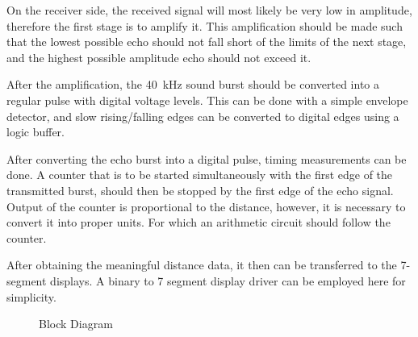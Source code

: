 \documentclass[12pt, a4paper]{article}
\begin{document}
        \bigskip
        On the receiver side, the received signal will most likely be very low in amplitude, therefore the first stage is to amplify it. This amplification should be made such that the lowest possible echo should not fall short of the limits of the next stage, and the highest possible amplitude echo should not exceed it.
        
        \bigskip
        After the amplification, the \SI{40}{\kilo\hertz} sound burst should be converted into a regular pulse with digital voltage levels. This can be done with a simple envelope detector, and slow rising/falling edges can be converted to digital edges using a logic buffer. 

        \bigskip
        After converting the echo burst into a digital pulse, timing measurements can be done. A counter that is to be started simultaneously with the first edge of the transmitted burst, should then be stopped by the first edge of the echo signal. Output of the counter is proportional to the distance, however, it is necessary to convert it into proper units. For which an arithmetic circuit should follow the counter.

        \bigskip
        After obtaining the meaningful distance data, it then can be transferred to the 7-segment displays. A binary to 7 segment display driver can be employed here for simplicity.

        \pagebreak
        \begin{landscape}\centering
            \vspace*{1.8cm}
            \begin{figure}[H]\centering
                \caption{Block Diagram}
            \end{figure}
        \end{landscape}
        \vfill
        \pagebreak
\end{document}
